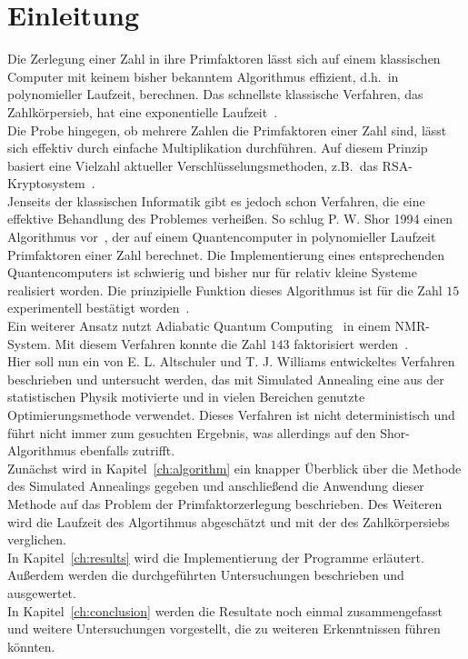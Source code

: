\chapter{Einleitung}
\setcounter{page}{1}
Die Zerlegung einer Zahl in ihre Primfaktoren lässt sich auf einem klassischen Computer mit keinem bisher bekanntem Algorithmus effizient, d.h.\ in polynomieller Laufzeit, berechnen. Das schnellste klassische Verfahren, das Zahlkörpersieb, hat eine exponentielle Laufzeit~\parencite{pomerance}.\\
Die Probe hingegen, ob mehrere Zahlen die Primfaktoren einer Zahl sind, lässt sich effektiv durch einfache Multiplikation durchführen. Auf diesem Prinzip basiert eine Vielzahl aktueller Verschlüsselungsmethoden, z.B.\ das RSA-Kryptosystem~\parencite{rsa}. \\
Jenseits der klassischen Informatik gibt es jedoch schon Verfahren, die eine effektive Behandlung des Problemes verheißen. So schlug P. W. Shor 1994 einen Algorithmus vor~\parencite{shor}, der auf einem Quantencomputer in polynomieller Laufzeit Primfaktoren einer Zahl berechnet. Die Implementierung eines entsprechenden Quantencomputers ist schwierig und bisher nur für relativ kleine Systeme realisiert worden. Die prinzipielle Funktion dieses Algorithmus ist für die Zahl $15$ experimentell bestätigt worden~\parencite{vandersypen}.\\
Ein weiterer Ansatz nutzt Adiabatic Quantum Computing~\parencite{suter} in einem NMR-System. Mit diesem Verfahren konnte die Zahl $143$ faktorisiert werden~\parencite{xu}. \\
Hier soll nun ein von E. L. Altschuler und T. J. Williams entwickeltes Verfahren~\parencite{altschuler} beschrieben und untersucht werden, das mit Simulated Annealing eine aus der statistischen Physik motivierte und in vielen Bereichen genutzte Optimierungsmethode verwendet. Dieses Verfahren ist nicht deterministisch und führt nicht immer zum gesuchten Ergebnis, was allerdings auf den Shor-Algorithmus ebenfalls zutrifft.\\
Zunächst wird in Kapitel~\ref{ch:algorithm} ein knapper Überblick über die Methode des Simulated Annealings gegeben und anschließend die Anwendung dieser Methode auf das Problem der Primfaktorzerlegung beschrieben. Des Weiteren wird die Laufzeit des Algortihmus abgeschätzt und mit der des Zahlkörpersiebs verglichen.\\
In Kapitel~\ref{ch:results} wird die Implementierung der Programme erläutert. Außerdem werden die durchgeführten Untersuchungen beschrieben und ausgewertet.\\
In Kapitel~\ref{ch:conclusion} werden die Resultate noch einmal zusammengefasst und weitere Untersuchungen vorgestellt, die zu weiteren Erkenntnissen führen könnten.
